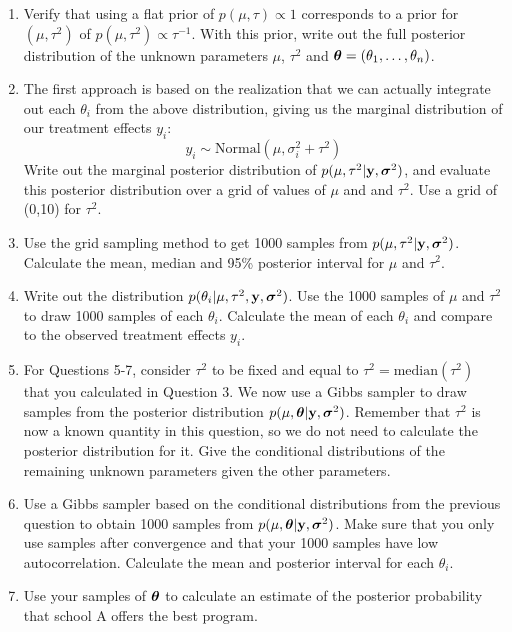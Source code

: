 \documentclass[12pt]{article}
\def\y{\mathbf{y}}
\newcommand{\si}{\mbox{\boldmath $\sigma$}}
\newcommand{\bth}{\mbox{\boldmath $\theta$}}
\begin{document}
\begin{enumerate}{\leftmargin=1em}
\item Verify that using a flat prior of $p(\mu,\tau)\propto 1$ corresponds to a prior for
$(\mu,\tau^2)$ of $p(\mu,\tau^2) \propto \tau^{-1}$.  With this prior, write out the 
full posterior distribution of the unknown parameters $\mu$, $\tau^2$ and 
$\bth=(\theta_1,\ldots,\theta_n)$.

\item The first approach is based on the realization that we can actually integrate out 
each $\theta_i$ from the above distribution, giving us the marginal distribution of our 
treatment effects $y_i$:
$$
y_i \sim \mbox{Normal}(\mu,\sigma^2_i+\tau^2)
$$
Write out the marginal posterior distribution of $p(\mu,\tau^2|\y,\si^2)$, and evaluate this posterior
distribution over a grid of values of $\mu$ and and $\tau^2$. Use a grid of (0,10) for $\tau^2$.

\item Use the grid sampling method to get 1000 samples from $p(\mu,\tau^2|\y,\si^2)$. 
Calculate the mean, median and 95\% posterior interval for $\mu$ and $\tau^2$.

\item Write out the distribution $p(\theta_i|\mu,\tau^2,\y,\si^2)$. Use the 1000 samples 
of $\mu$ and $\tau^2$ to draw 1000 samples of each $\theta_i$. Calculate the mean of each $\theta_i$ and 
compare to the observed treatment effects $y_i$.

\item For Questions 5-7, consider $\tau^2$ to be fixed and equal to $\tau^2 = \mbox{median}(\tau^2)$ 
that you calculated in Question 3. We now use a Gibbs sampler to draw samples from the posterior
distribution $p(\mu,\bth|\y,\si^2)$. Remember that $\tau^2$ is now a known quantity in this question, 
so we do not need to calculate the posterior distribution for it. Give the conditional distributions
of the remaining unknown parameters given the other parameters.

\item Use a Gibbs sampler based on the conditional distributions from the previous question
to obtain 1000 samples from $p(\mu,\bth|\y,\si^2)$. Make sure that you only use samples after
convergence and that your 1000 samples have low autocorrelation. Calculate the mean
and posterior interval for each $\theta_i$.

\item Use your samples of $\bth$ to calculate an estimate of the posterior probability that school
A offers the best program.


\end{enumerate}
\end{document}
